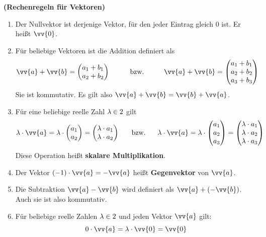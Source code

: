 \documentclass[ngerman, 12pt]{nssheetxea}
\begin{document}
\begin{theorem} \textbf{(Rechenregeln für Vektoren)}
\begin{enumerate}
\item Der Nullvektor ist derjenige Vektor, für den jeder Eintrag gleich $0$ ist. Er heißt $\vv{0}$.
\item Für beliebige Vektoren ist die Addition definiert als
\[ \vv{a} + \vv{b} = \begin{pmatrix} a_1+b_1 \\ a_2+b_2  \end{pmatrix} \hspace{1cm} \text{bzw.} \hspace{1cm}  \vv{a} + \vv{b} = \begin{pmatrix} a_1+b_1 \\ a_2+b_2 \\ a_3+b_3  \end{pmatrix} \]
Sie ist kommutativ. Es gilt also $\vv{a} + \vv{b} = \vv{b} + \vv{a}$.
\item Für eine beliebige reelle Zahl $\lambda \in 2$ gilt \[ \lambda \cdot \vv{a} = \lambda \cdot \begin{pmatrix} a_1 \\ a_2  \end{pmatrix} = \begin{pmatrix} \lambda \cdot a_1 \\ \lambda \cdot a_2  \end{pmatrix} \hspace{0.6cm} \text{bzw.} \hspace{0.6cm}  \lambda \cdot \vv{a} = \lambda \cdot \begin{pmatrix} a_1\\ a_2 \\ a_3 \end{pmatrix} = \begin{pmatrix} \lambda \cdot a_1\\ \lambda \cdot a_2 \\ \lambda \cdot a_3 \end{pmatrix}\]
Diese Operation heißt \textbf{skalare Multiplikation}.
\item Der Vektor $(-1)\cdot \vv{a} = -\vv{a}$ heißt \textbf{Gegenvektor} von $\vv{a}$.
\item Die Subtraktion $\vv{a} - \vv{b}$ wird definiert als $\vv{a} +  (-\vv{b})$. Auch sie ist also kommutativ.
\item Für beliebige reelle Zahlen $\lambda \in 2$ und jeden Vektor $\vv{a}$ gilt:
\[ 0 \cdot \vv{a} = \lambda \cdot \vv{0} = \vv{0} \]
  
\end{enumerate}
\label{Satz:RR_fuer_Vektoren}
\end{theorem}
\end{document}
